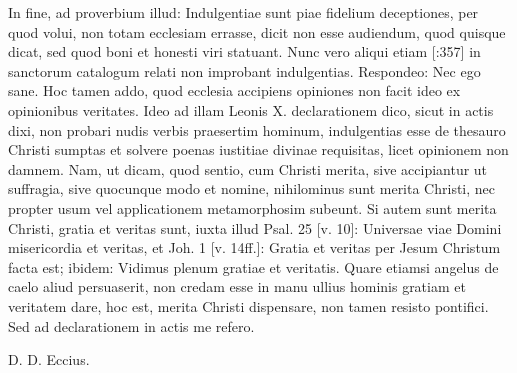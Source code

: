In fine, ad proverbium illud: Indulgentiae sunt piae fidelium deceptiones, per quod volui, non totam ecclesiam errasse, dicit non esse audiendum, quod quisque dicat, sed quod boni et honesti viri statuant. Nunc vero aliqui etiam [:357] in sanctorum catalogum relati non improbant indulgentias. Respondeo: Nec ego sane. Hoc tamen addo, quod ecclesia accipiens opiniones non facit ideo ex opinionibus veritates. Ideo ad illam Leonis X. declarationem dico, sicut in actis dixi, non probari nudis verbis praesertim hominum, indulgentias esse de thesauro Christi sumptas et solvere poenas iustitiae divinae requisitas, licet opinionem non damnem. Nam, ut dicam, quod sentio, cum Christi merita, sive accipiantur ut suffragia, sive quocunque modo et nomine, nihilominus sunt merita Christi, nec propter usum vel applicationem metamorphosim subeunt. Si autem sunt merita Christi, gratia et veritas sunt, iuxta illud Psal. 25 [v. 10]: Universae viae Domini misericordia et veritas, et Joh. 1 [v. 14ff.]: Gratia et veritas per Jesum Christum facta est; ibidem: Vidimus plenum gratiae et veritatis. Quare etiamsi angelus de caelo aliud persuaserit, non credam esse in manu ullius hominis gratiam et veritatem dare, hoc est, merita Christi dispensare, non tamen resisto pontifici. Sed ad declarationem in actis me refero.

D. D. Eccius.


